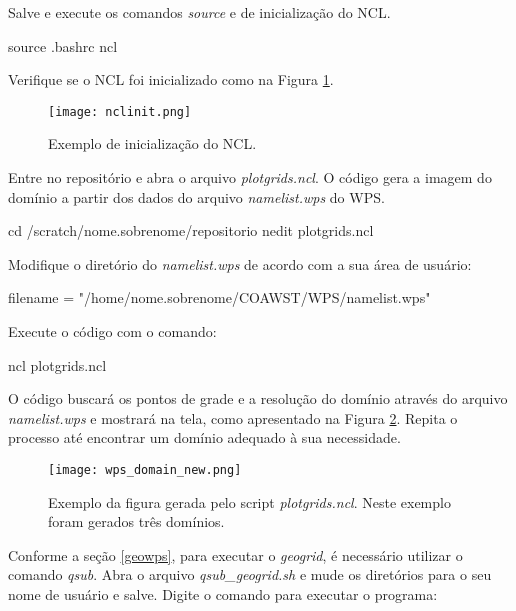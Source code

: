 \noindent Salve e execute os comandos \textit{source} e de inicialização do NCL.
\bigskip

\begin{bashcode}
source .bashrc
ncl
\end{bashcode}
\bigskip

\noindent Verifique se o NCL foi inicializado como na Figura \ref{nclinit}.
\bigskip

\begin{figure}[H]
    \centering
    \texttt{[image: nclinit.png]}
    \caption{Exemplo de inicialização do NCL.}
    \label{nclinit}
\end{figure}
\bigskip


\noindent Entre no repositório e abra o arquivo \textit{plotgrids.ncl}. O código gera a imagem do domínio a partir dos dados do arquivo \textit{namelist.wps} do WPS.
\bigskip

\begin{bashcode}
cd /scratch/nome.sobrenome/repositorio
nedit plotgrids.ncl
\end{bashcode}
\bigskip

\noindent Modifique o diretório do \textit{namelist.wps} de acordo com a sua área de usuário:
\bigskip

\begin{bashcode}
filename = "/home/nome.sobrenome/COAWST/WPS/namelist.wps"
\end{bashcode}
\bigskip

\noindent Execute o código com o comando:
\bigskip

\begin{bashcode}
ncl plotgrids.ncl
\end{bashcode}
\bigskip

\noindent O código buscará os pontos de grade e a resolução do domínio através do arquivo \textit{namelist.wps} e mostrará na tela, como apresentado na Figura \textcolor{bleu_cite}{\ref{nclgrids}}. Repita o processo até encontrar um domínio adequado à sua necessidade.
\bigskip

\begin{figure}[H]
    \centering
    \texttt{[image: wps\_domain\_new.png]}
    \caption{Exemplo da figura gerada pelo script \textit{plotgrids.ncl}. Neste exemplo foram gerados três domínios.}
    \label{nclgrids}
\end{figure}
\bigskip


\noindent Conforme a seção \textcolor{bleu_cite}{\ref{geowps}}, para executar o \textit{geogrid}, é necessário utilizar o comando \textit{qsub}. Abra o arquivo \textit{qsub\_geogrid.sh} e mude os diretórios para o seu nome de usuário e salve. Digite o comando para executar o programa:
\bigskip

